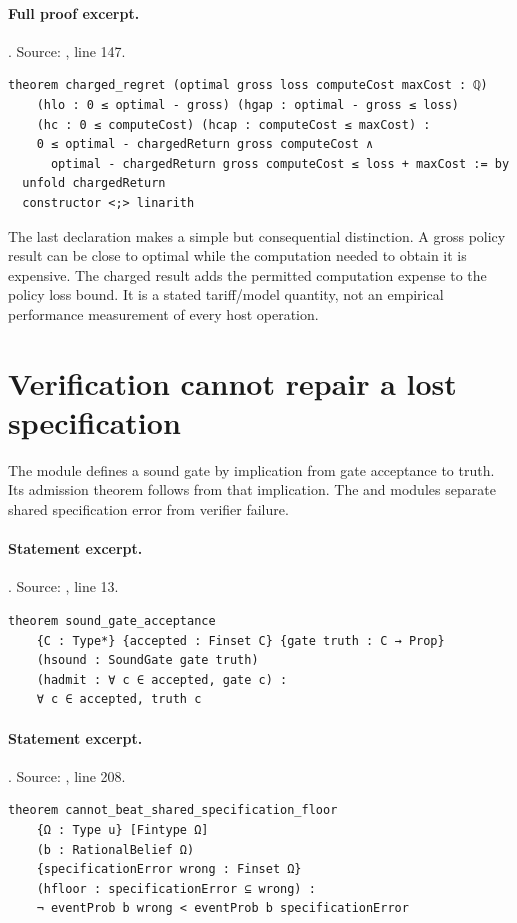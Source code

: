 \documentclass[11pt]{article}
\begin{document}
\paragraph{Full proof excerpt.}. Source: , line 147.
\begin{lstlisting}[style=AVOCSource]
theorem charged_regret (optimal gross loss computeCost maxCost : ℚ)
    (hlo : 0 ≤ optimal - gross) (hgap : optimal - gross ≤ loss)
    (hc : 0 ≤ computeCost) (hcap : computeCost ≤ maxCost) :
    0 ≤ optimal - chargedReturn gross computeCost ∧
      optimal - chargedReturn gross computeCost ≤ loss + maxCost := by
  unfold chargedReturn
  constructor <;> linarith
\end{lstlisting}


The last declaration makes a simple but consequential distinction. A gross
policy result can be close to optimal while the computation needed to obtain
it is expensive. The charged result adds the permitted computation expense to
the policy loss bound. It is a stated tariff/model quantity, not an empirical
performance measurement of every host operation.

\section{Verification cannot repair a lost specification}
The  module defines a sound gate by implication from gate
acceptance to truth. Its admission theorem follows from that implication. The
 and  modules separate shared
specification error from verifier failure.

\paragraph{Statement excerpt.}. Source: , line 13.
\begin{lstlisting}[style=AVOCSource]
theorem sound_gate_acceptance
    {C : Type*} {accepted : Finset C} {gate truth : C → Prop}
    (hsound : SoundGate gate truth)
    (hadmit : ∀ c ∈ accepted, gate c) :
    ∀ c ∈ accepted, truth c
\end{lstlisting}

\paragraph{Statement excerpt.}. Source: , line 208.
\begin{lstlisting}[style=AVOCSource]
theorem cannot_beat_shared_specification_floor
    {Ω : Type u} [Fintype Ω]
    (b : RationalBelief Ω)
    {specificationError wrong : Finset Ω}
    (hfloor : specificationError ⊆ wrong) :
    ¬ eventProb b wrong < eventProb b specificationError
\end{lstlisting}
\end{document}
